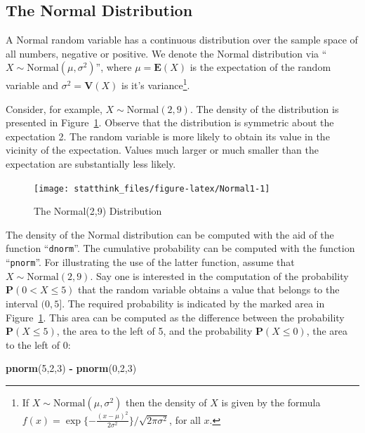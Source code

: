 \documentclass[
]{krantz}
\makeatletter
\newenvironment{Shaded}{\begin{snugshade}}{\end{snugshade}}
\newcommand{\DecValTok}[1]{\textcolor[rgb]{0.00,0.00,0.81}{#1}}
\newcommand{\KeywordTok}[1]{\textcolor[rgb]{0.13,0.29,0.53}{\textbf{#1}}}
\newcommand{\NormalTok}[1]{#1}
\newcommand{\OperatorTok}[1]{\textcolor[rgb]{0.81,0.36,0.00}{\textbf{#1}}}
\newcommand{\StringTok}[1]{\textcolor[rgb]{0.31,0.60,0.02}{#1}}
\newcommand{\Expec}{\mathbf{E}}
\newcommand{\Prob}{\mathbf{P}}
\newcommand{\Var}{\mathbf{V}}
\newenvironment{kframe}{%
\medskip{}
\setlength{\fboxsep}{.8em}
 \def\at@end@of@kframe{}%
 \ifinner\ifhmode%
  \def\at@end@of@kframe{\end{minipage}}%
  \begin{minipage}{\columnwidth}%
 \fi\fi%
 \def\FrameCommand##1{\hskip\@totalleftmargin \hskip-\fboxsep
 \colorbox{shadecolor}{##1}\hskip-\fboxsep
     \hskip-\linewidth \hskip-\@totalleftmargin \hskip\columnwidth}%
 \MakeFramed {\advance\hsize-\width
   \@totalleftmargin\z@ \linewidth\hsize
   \@setminipage}}%
 {\par\unskip\endMakeFramed%
 \at@end@of@kframe}
\renewenvironment{Shaded}{\begin{kframe}}{\end{kframe}}
\theoremstyle{definition}
\theoremstyle{definition}
\theoremstyle{definition}
\theoremstyle{remark}
\makeatother
\begin{document}
\hypertarget{the-normal-distribution}{%
\subsection{The Normal Distribution}\label{the-normal-distribution}}

A Normal random variable has a continuous distribution over the sample
space of all numbers, negative or positive. We denote the Normal
distribution via ``\(X \sim \mathrm{Normal}(\mu, \sigma^2)\)'', where
\(\mu = \Expec(X)\) is the expectation of the random variable and
\(\sigma^2 = \Var(X)\) is it's variance\footnote{If \(X \sim \mbox{Normal}(\mu,\sigma^2)\) then the density of \(X\) is
  given by the formula
  \(f(x) = \exp\{-\frac{(x-\mu)^2}{2 \sigma^2}\}/\sqrt{2 \pi \sigma^2}\),
  for all \(x\).}.

Consider, for example, \(X \sim \mathrm{Normal}(2,9)\). The density of the
distribution is presented in Figure~\ref{fig:Normal1}. Observe that the
distribution is symmetric about the expectation 2. The random variable
is more likely to obtain its value in the vicinity of the expectation.
Values much larger or much smaller than the expectation are
substantially less likely.

\begin{figure}

{\centering \texttt{[image: statthink\_files/figure-latex/Normal1-1]} 

}

\caption{The Normal(2,9) Distribution}\label{fig:Normal1}
\end{figure}

The density of the Normal distribution can be computed with the aid of
the function ``\texttt{dnorm}''. The cumulative probability can be computed with
the function ``\texttt{pnorm}''. For illustrating the use of the latter function,
assume that \(X \sim \mathrm{Normal}(2,9)\). Say one is interested in the
computation of the probability \(\Prob(0 < X \leq 5)\) that the random
variable obtains a value that belongs to the interval \((0,5]\). The
required probability is indicated by the marked area in
Figure~\ref{fig:Normal1}. This area can be computed as the difference
between the probability \(\Prob(X \leq 5)\), the area to the left of 5,
and the probability \(\Prob(X \leq 0)\), the area to the left of 0:

\begin{Shaded}
\begin{Highlighting}[]
\KeywordTok{pnorm}\NormalTok{(}\DecValTok{5}\NormalTok{,}\DecValTok{2}\NormalTok{,}\DecValTok{3}\NormalTok{) }\OperatorTok{-}\StringTok{ }\KeywordTok{pnorm}\NormalTok{(}\DecValTok{0}\NormalTok{,}\DecValTok{2}\NormalTok{,}\DecValTok{3}\NormalTok{)}
\end{Highlighting}
\end{Shaded}
\end{document}
